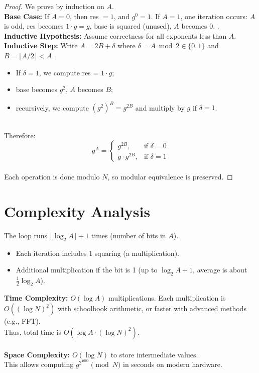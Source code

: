 \documentclass[12pt,openany]{book}
\theoremstyle{definition}
\theoremstyle{plain}
\theoremstyle{remark}
\begin{document}
\begin{proof}
We prove by induction on $A$.
\noindent
\\
\textbf{Base Case:} If $A = 0$, then res $= 1$, and $g^0 = 1$. If $A = 1$, one iteration occurs: $A$ is odd, res becomes $1 \cdot g = g$, base is squared (unused), $A$ becomes 0. .
\noindent
\\
\textbf{Inductive Hypothesis:} Assume correctness for all exponents less than $A$.
\noindent
\\
\textbf{Inductive Step:} Write $A = 2B + \delta$ where $\delta = A \bmod 2 \in \{0,1\}$ and $B = \lfloor A / 2 \rfloor < A$.
\begin{itemize}
  \item If $\delta = 1$, we compute res = $1 \cdot g$;
  \item base becomes $g^2$, $A$ becomes $B$;
  \item recursively, we compute $(g^2)^B = g^{2B}$ and multiply by $g$ if $\delta = 1$.
\end{itemize}
\noindent
\\
Therefore:
\[
g^A = 
\begin{cases}
g^{2B}, & \text{if } \delta = 0 \\
g \cdot g^{2B}, & \text{if } \delta = 1
\end{cases}
\]
\noindent
\\
Each operation is done modulo $N$, so modular equivalence is preserved.
\end{proof}

\section{Complexity Analysis}

The loop runs $\lfloor \log_2 A \rfloor + 1$ times (number of bits in $A$).

\begin{itemize}
  \item Each iteration includes 1 squaring (a multiplication).
  \item Additional multiplication if the bit is 1 (up to $\log_2 A + 1$, average is about $\frac{1}{2} \log_2 A$).
\end{itemize}

\noindent
\textbf{Time Complexity:} $O(\log A)$ multiplications. Each multiplication is $O((\log N)^2)$ with schoolbook arithmetic, or faster with advanced methods (e.g., FFT).
\noindent
\\
Thus, total time is $O(\log A \cdot (\log N)^2)$.
\\
\noindent
\\
\textbf{Space Complexity:} $O(\log N)$ to store intermediate values.
\noindent
\\
This allows computing $g^{2^{1000}} \pmod{N}$ in seconds on modern hardware.
\end{document}

